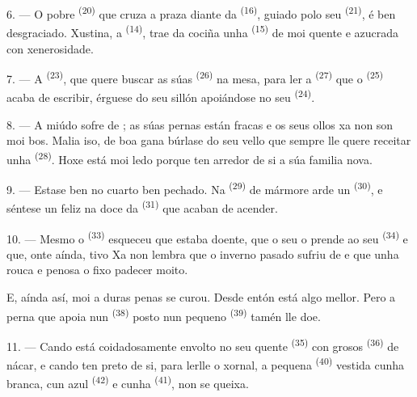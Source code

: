 \VUsaut{4.2mm}
\VUsaut{3.0mm}

6. --- O pobre  \textsuperscript{(20)} que cruza a praza diante da
 \textsuperscript{(16)}, guiado polo seu 
\textsuperscript{(21)}, é ben desgraciado. Xustina, a 
\textsuperscript{(14)}, trae da cociña unha 
\textsuperscript{(15)} de  moi quente e azucrada con xenerosidade.

7. --- A  \textsuperscript{(23)}, que quere buscar as súas
 \textsuperscript{(26)} na mesa, para ler a 
\textsuperscript{(27)} que o  \textsuperscript{(25)} acaba de
escribir, érguese do seu sillón apoiándose no seu 
\textsuperscript{(24)}.

8. --- A miúdo sofre de ; as
súas pernas están fracas e os seus ollos xa non son moi bos. Malia iso, de boa gana
búrlase do seu vello  que sempre lle quere receitar unha
 \textsuperscript{(28)}. Hoxe está moi ledo porque ten arredor de si a
súa familia nova.

9. --- Estase ben no cuarto ben pechado. Na  \textsuperscript{(29)}
de mármore arde un  \textsuperscript{(30)}, e séntese un
feliz na doce  da  \textsuperscript{(31)} que acaban de
acender.

\VUsaut{4.2mm}
\VUsaut{3.0mm}

10. --- Mesmo o  \textsuperscript{(33)} esqueceu que estaba doente, que o
seu  o prende ao seu  \textsuperscript{(34)} e que,
onte aínda, tivo  Xa non lembra que o inverno pasado
sufriu de  e que unha  rouca e penosa o fixo padecer
moito.

E, aínda así, moi a duras penas se curou. Desde entón está algo mellor. Pero a perna
que apoia nun  \textsuperscript{(38)} posto nun pequeno
 \textsuperscript{(39)} tamén lle doe.

11. --- Cando está coidadosamente envolto no seu quente 
\textsuperscript{(35)} con grosos  \textsuperscript{(36)} de nácar, e
cando ten preto de si, para lerlle o xornal, a pequena 
\textsuperscript{(40)} vestida cunha  branca, cun 
azul \textsuperscript{(42)} e cunha  \textsuperscript{(41)}, non se
queixa.

